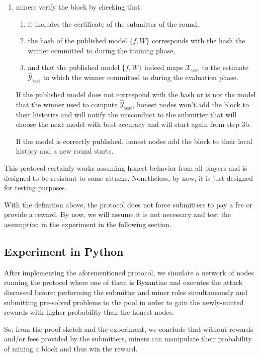 \documentclass[conference]{IEEEtran}
\begin{document}
\begin{enumerate}
\begin{enumerate}
        \item miners verify the block by checking that:
        \begin{enumerate}
            \item it includes the certificate of the submitter of the round,
            \item the hash of the published model $\{f,W\}$ corresponds with the hash the winner committed to during the training phase,
            \item and that the published model $\{f,W\}$ indeed maps $\mathcal X_\text{test}$ to the estimate $\hat{\mathcal Y}_{\text{test}}$ to which the winner committed to during the evaluation phase.
        \end{enumerate}
        If the published model does not correspond with the hash or is not the model that the winner used to compute $\hat{\mathcal Y}_{\text{test}}$, honest nodes won't add the block to their histories and will notify the misconduct to the submitter that will choose the next model with best accuracy and will start again from step 3b.
        
        If the model is correctly published, honest nodes add the block to their local history and a new round starts.
    \end{enumerate}
\end{enumerate}

This protocol certainly works assuming honest behavior from all players and is designed to be resistant to some attacks. Nonetheless, by now, it is just designed for testing purposes.

With the definition above, the protocol does not force submitters to pay a fee or provide a reward. By now, we will assume it is not necessary and test the assumption in the experiment in the following section.

\subsection{Experiment in Python}
After implementing the aforementioned protocol, we simulate a network of nodes running the protocol where one of them is Byzantine and executes the attack discussed before: performing the submitter and miner roles simultaneously and submitting pre-solved problems to the pool in order to gain the newly-minted rewards with higher probability than the honest nodes.



So, from the proof sketch and the experiment, we conclude that without rewards and/or fees provided by the submitters, miners can manipulate their probability of mining a block and thus win the reward.
\end{document}
